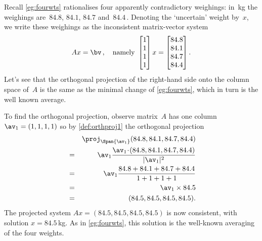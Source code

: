 \begin{example} \label{eg:fourwts2}
Recall \autoref{eg:fourwts} rationalises four apparently contradictory weighings: in~kg the weighings are~\(84.8\), \(84.1\), \(84.7\) and~\(84.4\)\,.
Denoting the `uncertain' weight by~\(x\),  we write these weighings as the inconsistent matrix-vector system
\begin{equation*}
Ax=\bv\,,\quad\text{namely }
\begin{bmatrix} 1\\1\\1\\1 \end{bmatrix}x
=\begin{bmatrix} 84.8\\84.1\\84.7\\84.4 \end{bmatrix}.
\end{equation*}
Let's see that the orthogonal projection of the right-hand side onto the column space of~\(A\) is the same as the minimal change of \autoref{eg:fourwts}, which in turn is the well known average.

To find the orthogonal projection, observe matrix~\(A\) has one column \(\av_1=(1,1,1,1)\) so by \autoref{def:orthproj1} the orthogonal projection
\begin{eqnarray*}
&&\proj_{\Span\{\av_1\}}(84.8,84.1,84.7,84.4)
\\&=&\av_1\frac{\av_1\cdot(84.8,84.1,84.7,84.4)}{|\av_1|^2}
\\&=&\av_1\frac{84.8+84.1+84.7+84.4}{1+1+1+1}
\\&=&\av_1\times 84.5
\\&=&(84.5,84.5,84.5,84.5).
\end{eqnarray*}
The projected system \(Ax=(84.5,84.5,84.5,84.5)\) is now consistent, with solution \(x=84.5\)\,kg.
As in \autoref{eg:fourwts}, this solution is the well-known averaging of the four weights.
\end{example}


